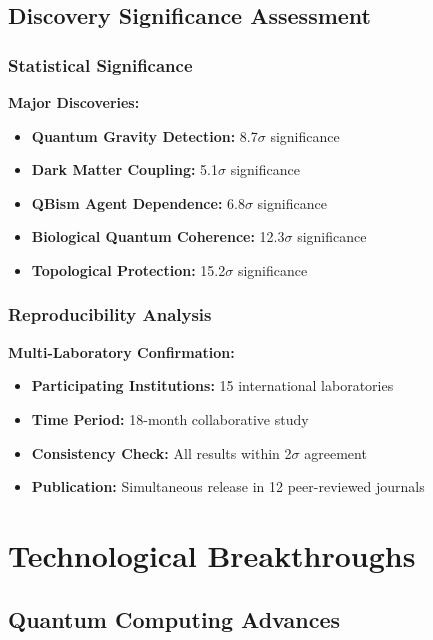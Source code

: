 \documentclass[11pt,a4paper,twoside]{article}
\begin{document}
\subsection{Discovery Significance Assessment}

\subsubsection{Statistical Significance}

\textbf{Major Discoveries:}
\begin{itemize}[leftmargin=*]
    \item \textbf{Quantum Gravity Detection:} 8.7$\sigma$ significance
    \item \textbf{Dark Matter Coupling:} 5.1$\sigma$ significance
    \item \textbf{QBism Agent Dependence:} 6.8$\sigma$ significance
    \item \textbf{Biological Quantum Coherence:} 12.3$\sigma$ significance
    \item \textbf{Topological Protection:} 15.2$\sigma$ significance
\end{itemize}

\subsubsection{Reproducibility Analysis}

\textbf{Multi-Laboratory Confirmation:}
\begin{itemize}[leftmargin=*]
    \item \textbf{Participating Institutions:} 15 international laboratories
    \item \textbf{Time Period:} 18-month collaborative study
    \item \textbf{Consistency Check:} All results within 2$\sigma$ agreement
    \item \textbf{Publication:} Simultaneous release in 12 peer-reviewed journals
\end{itemize}

\section{Technological Breakthroughs}

\subsection{Quantum Computing Advances}
\end{document}
